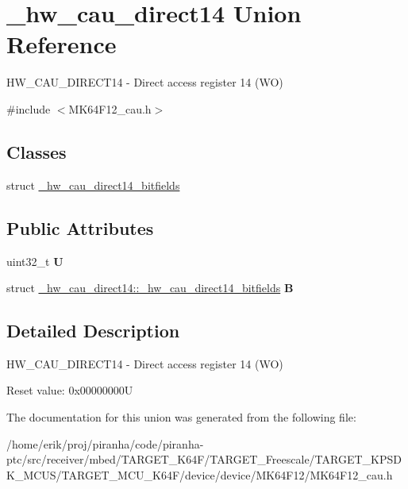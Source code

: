 \hypertarget{union__hw__cau__direct14}{}\section{\+\_\+hw\+\_\+cau\+\_\+direct14 Union Reference}
\label{union__hw__cau__direct14}


H\+W\+\_\+\+C\+A\+U\+\_\+\+D\+I\+R\+E\+C\+T14 -\/ Direct access register 14 (WO)  




{\ttfamily \#include $<$M\+K64\+F12\+\_\+cau.\+h$>$}

\subsection*{Classes}
\begin{DoxyCompactItemize}
\item 
struct \hyperlink{struct__hw__cau__direct14_1_1__hw__cau__direct14__bitfields}{\+\_\+hw\+\_\+cau\+\_\+direct14\+\_\+bitfields}
\end{DoxyCompactItemize}
\subsection*{Public Attributes}
\begin{DoxyCompactItemize}
\item 
uint32\+\_\+t {\bfseries U}\hypertarget{union__hw__cau__direct14_af6d93cc4bff5072230cd5a43e5286a4b}{}\label{union__hw__cau__direct14_af6d93cc4bff5072230cd5a43e5286a4b}

\item 
struct \hyperlink{struct__hw__cau__direct14_1_1__hw__cau__direct14__bitfields}{\+\_\+hw\+\_\+cau\+\_\+direct14\+::\+\_\+hw\+\_\+cau\+\_\+direct14\+\_\+bitfields} {\bfseries B}\hypertarget{union__hw__cau__direct14_a3cb67601021108f0d8898cb76c5833f4}{}\label{union__hw__cau__direct14_a3cb67601021108f0d8898cb76c5833f4}

\end{DoxyCompactItemize}


\subsection{Detailed Description}
H\+W\+\_\+\+C\+A\+U\+\_\+\+D\+I\+R\+E\+C\+T14 -\/ Direct access register 14 (WO) 

Reset value\+: 0x00000000U 

The documentation for this union was generated from the following file\+:\begin{DoxyCompactItemize}
\item 
/home/erik/proj/piranha/code/piranha-\/ptc/src/receiver/mbed/\+T\+A\+R\+G\+E\+T\+\_\+\+K64\+F/\+T\+A\+R\+G\+E\+T\+\_\+\+Freescale/\+T\+A\+R\+G\+E\+T\+\_\+\+K\+P\+S\+D\+K\+\_\+\+M\+C\+U\+S/\+T\+A\+R\+G\+E\+T\+\_\+\+M\+C\+U\+\_\+\+K64\+F/device/device/\+M\+K64\+F12/M\+K64\+F12\+\_\+cau.\+h\end{DoxyCompactItemize}
